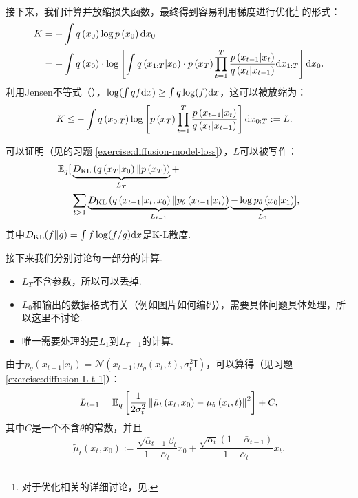 接下来，我们计算并放缩损失函数，最终得到容易利用梯度进行优化\footnote{对于优化相关的详细讨论，见. }
    的形式：
\[
\begin{aligned}
    K & =-\int q\left(x_{0}\right) \log p\left(x_{0}\right) \mathrm{d} x_{0} \\
    & =-\int q\left(x_{0}\right) \cdot \log \left[\int q\left(x_{1:T} | x_{0}\right) \cdot p\left(x_{T}\right) \prod_{t=1}^T \frac{p\left(x_{t-1} | x_{t}\right)}{q\left(x_{t} | x_{t-1}\right)}\mathrm{d} x_{1:T}\right]\mathrm{d} x_{0}.
\end{aligned}
\]
利用Jensen不等式（），$\log(\int q f\mathrm{d} x)\geq\int q\log(f)\mathrm{d} x$，这可以被放缩为：
\[
\begin{aligned}
    K \leq & -\int q\left(x_{0:T}\right) \log \left[p\left(x_{T}\right) \prod_{t=1}^T \frac{p\left(x_{t-1} | x_{t}\right)}{q\left(x_{t} | x_{t-1}\right)}\right] \mathrm{d} x_{0:T}:=L.
\end{aligned}
\]

可以证明（见的习题 \ref{exercise:diffusion-model-loss}），$L$可以被写作：
\[
\begin{aligned}
    \mathbb{E}_q[&\underbrace{D_{\mathrm{KL}}\left(q\left(x_T | x_0\right) \| p\left(x_T\right)\right)}_{L_T}+\\
    &\sum_{t>1} \underbrace{D_{\mathrm{KL}}\left(q\left(x_{t-1} | x_t, x_0\right) \| p_\theta\left(x_{t-1} | x_t\right)\right)}_{L_{t-1}} \underbrace{-\log p_\theta\left(x_0 | x_1\right)}_{L_0}],
\end{aligned}
\]
其中$D_{\mathrm{KL}}(f\|g)=\int f\log(f/g)\mathrm{d} x$是K-L散度. 

接下来我们分别讨论每一部分的计算. 
\begin{itemize}
    \item $L_T$不含参数，所以可以丢掉. 
    \item $L_0$和输出的数据格式有关（例如图片如何编码），需要具体问题具体处理，所以这里不讨论. 
    \item 唯一需要处理的是$L_1$到$L_{T-1}$的计算. 
\end{itemize}

由于$p_\theta\left(x_{t-1}|x_t\right)=\mathcal{N}\left(x_{t-1} ; \mu_\theta\left(x_t, t\right), \sigma_t^2 \mathbf{I}\right)$，可以算得（见习题 \ref{exercise:diffusion-L-t-1}）：
\begin{equation}
L_{t-1}=\mathbb{E}_q\left[\frac{1}{2 \sigma_t^2}\left\|\tilde{\mu}_t\left(x_t, x_0\right)-\mu_\theta\left(x_t, t\right)\right\|^2\right]+C,\label{eq:diffusion-L-t-1}
\end{equation}
其中$C$是一个不含$\theta$的常数，并且
\[
\tilde{\mu}_t\left(x_t, x_0\right):=\frac{\sqrt{\bar{\alpha}_{t-1}} \beta_t}{1-\bar{\alpha}_t} x_0+\frac{\sqrt{\alpha_t}\left(1-\bar{\alpha}_{t-1}\right)}{1-\bar{\alpha}_t} x_t.
\]

